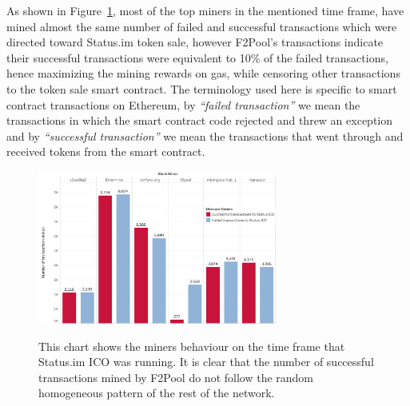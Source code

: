 As shown in Figure~\ref{fig:Transactions_miners_while_status_ico_cut}, most of the top miners in the mentioned time frame, have mined almost the same number of failed and successful transactions which were directed toward Status.im token sale, however F2Pool's transactions indicate their successful transactions were equivalent to 10\% of the failed transactions, hence maximizing the mining rewards on gas, while censoring other transactions to the token sale smart contract. The terminology used here is specific to smart contract transactions on Ethereum, by \textit{``failed transaction''} we mean the transactions in which the smart contract code rejected and threw an exception and by \textit{``successful transaction''} we mean the transactions that went through and received tokens from the smart contract.


\begin{figure}[h]
    \centering
{\caption[Miner behaviour during the time of Status.im ICO]{This chart shows the miners behaviour on the time frame that Status.im ICO was running. It is clear that the number of successful transactions mined by F2Pool do not follow the random homogeneous pattern of the rest of the network.}\label{fig:Transactions_miners_while_status_ico_cut}}
{\includegraphics[width=0.7\textwidth]{figures/Transactions_miners_while_status_ico_cut_only_icotx.png}}
\end{figure}

